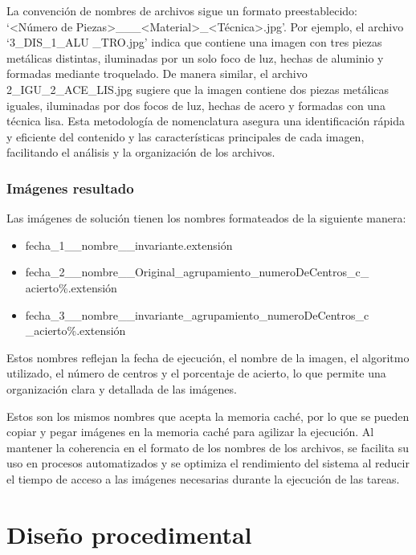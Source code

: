 La convención de nombres de archivos sigue un formato preestablecido: `<Número de Piezas>\_<Forma de las Piezas>\_<Número de Focos>\_<Material>\_<Técnica>.jpg'. Por ejemplo, el archivo `3\_DIS\_1\_ALU \_TRO.jpg' indica que contiene una imagen con tres piezas metálicas distintas, iluminadas por un solo foco de luz, hechas de aluminio y formadas mediante troquelado. De manera similar, el archivo 2\_IGU\_2\_ACE\_LIS.jpg sugiere que la imagen contiene dos piezas metálicas iguales, iluminadas por dos focos de luz, hechas de acero y formadas con una técnica lisa. Esta metodología de nomenclatura asegura una identificación rápida y eficiente del contenido y las características principales de cada imagen, facilitando el análisis y la organización de los archivos.

\subsubsection{Imágenes resultado}\label{imágenes-resultado}

Las imágenes de solución tienen los nombres formateados de la siguiente manera:
\begin{itemize}
    \item fecha\_1\_\_nombre\_\_invariante.extensión
    \item fecha\_2\_\_nombre\_\_Original\_agrupamiento\_numeroDeCentros\_c\_ acierto\%.extensión
    \item fecha\_3\_\_nombre\_\_invariante\_agrupamiento\_numeroDeCentros\_c \_acierto\%.extensión
\end{itemize}

Estos nombres reflejan la fecha de ejecución, el nombre de la imagen, el algoritmo utilizado, el número de centros y el porcentaje de acierto, lo que permite una organización clara y detallada de las imágenes.

Estos son los mismos nombres que acepta la memoria caché, por lo que se pueden copiar y pegar imágenes en la memoria caché para agilizar la ejecución. Al mantener la coherencia en el formato de los nombres de los archivos, se facilita su uso en procesos automatizados y se optimiza el rendimiento del sistema al reducir el tiempo de acceso a las imágenes necesarias durante la ejecución de las tareas.

\section{Diseño procedimental}\label{diseño-procedimental}

